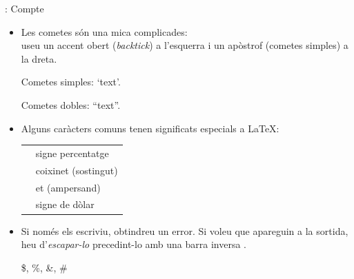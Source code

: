 \begin{frame}[fragile]{\insertsubsection{}: Compte}
\small
\begin{itemize}
\item Les cometes són una mica complicades:\\
useu un accent obert (\textit{backtick}) \keystroke{\`} a l'esquerra i un apòstrof (cometes simples)  a la dreta.
\begin{exampletwouptiny}
Cometes simples: `text'.

Cometes dobles: ``text''.
\end{exampletwouptiny}

\item Alguns caràcters comuns tenen significats especials a \LaTeX:\\[1ex]
\begin{tabular}{cl}
\keystrokebftt{\%} & signe percentatge         \\
\keystrokebftt{\#} & coixinet (sostingut)      \\
\keystrokebftt{\&} & et (ampersand)            \\
\keystrokebftt{\$} & signe de dòlar            \\
\end{tabular}
\item Si només els escriviu, obtindreu un error. 
    Si voleu que apareguin a la sortida, heu d'\textit{escapar-lo} precedint-lo amb una barra inversa \keystroke{\textbackslash}.
\begin{exampletwoup}
\$, \%, \&, \#
\end{exampletwoup}
\end{itemize}
\end{frame}

